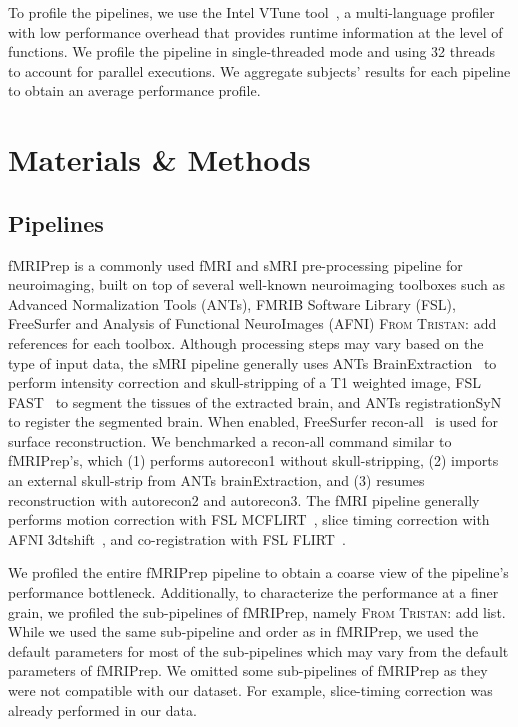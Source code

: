 \documentclass[conference]{IEEEtran}
\newcommand{\TG}[1]{\color{blue}\textsc{From Tristan: }#1\color{black}}
\begin{document}
To profile the pipelines, we use the Intel VTune tool~\cite{vtune-profiler}, a multi-language profiler with low performance overhead that provides runtime information at the level of functions. We profile the pipeline in single-threaded mode and using 32 threads to account for parallel executions. We aggregate subjects' results for each pipeline to obtain an average performance profile. 

\section{Materials \& Methods}
\subsection{Pipelines}
fMRIPrep is a commonly used fMRI and sMRI pre-processing pipeline for neuroimaging, built on top of several well-known neuroimaging toolboxes such as Advanced Normalization Tools (ANTs), FMRIB Software Library (FSL), FreeSurfer and Analysis of Functional NeuroImages (AFNI) \TG{add references for each toolbox}. Although processing steps may vary based on the type of input data, the sMRI pipeline generally uses ANTs BrainExtraction~\cite{Tustison2010-gg,Avants2008-ea} to perform intensity correction and skull-stripping of a T1 weighted image, FSL FAST~\cite{Zhang2001-hx} to segment the tissues of the extracted brain, and ANTs registrationSyN~\cite{Avants2008-ea} to register the segmented brain. When enabled, FreeSurfer recon-all~\cite{Dale1999-wu} is used for surface reconstruction. We benchmarked a recon-all command similar to  fMRIPrep's, which (1) performs autorecon1 without skull-stripping, (2) imports an external skull-strip from ANTs brainExtraction, and (3) resumes reconstruction with autorecon2 and autorecon3. The fMRI pipeline generally performs motion correction with FSL MCFLIRT~\cite{Jenkinson2002-od}, slice timing correction with AFNI 3dtshift~\cite{Cox1996-nk}, and co-registration with FSL FLIRT~\cite{Jenkinson2002-od,Jenkinson2001-eu,Greve2009-dw}.

We profiled the entire fMRIPrep pipeline to obtain a coarse view of the pipeline's performance bottleneck. Additionally, to characterize the performance at a finer grain, we profiled the sub-pipelines of fMRIPrep, namely \TG{add list}. While we used the same sub-pipeline and order as in fMRIPrep, we used the default parameters for most of the sub-pipelines which may vary from the default parameters of fMRIPrep. We omitted some sub-pipelines of fMRIPrep as they were not compatible with our dataset. For example, slice-timing correction was already performed in our data.
\end{document}
